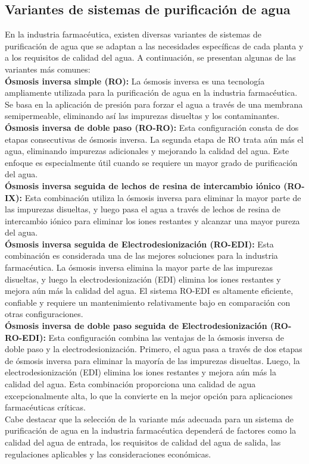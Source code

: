 \subsection{Variantes de sistemas de purificación de agua}

En la industria farmacéutica, existen diversas variantes de sistemas de purificación de agua que se adaptan a las necesidades específicas de cada planta y a los requisitos de calidad del agua. A continuación, se presentan algunas de las variantes más comunes:\\

\textbf{Ósmosis inversa simple (RO):} La ósmosis inversa es una tecnología ampliamente utilizada para la purificación de agua en la industria farmacéutica. Se basa en la aplicación de presión para forzar el agua a través de una membrana semipermeable, eliminando así las impurezas disueltas y los contaminantes.\\

\textbf{Ósmosis inversa de doble paso (RO-RO):} Esta configuración consta de dos etapas consecutivas de ósmosis inversa. La segunda etapa de RO trata aún más el agua, eliminando impurezas adicionales y mejorando la calidad del agua. Este enfoque es especialmente útil cuando se requiere un mayor grado de purificación del agua.\\

\textbf{Ósmosis inversa seguida de lechos de resina de intercambio iónico (RO-IX):} Esta combinación utiliza la ósmosis inversa para eliminar la mayor parte de las impurezas disueltas, y luego pasa el agua a través de lechos de resina de intercambio iónico para eliminar los iones restantes y alcanzar una mayor pureza del agua.\\

\textbf{Ósmosis inversa seguida de Electrodesionización (RO-EDI):} Esta combinación es considerada una de las mejores soluciones para la industria farmacéutica. La ósmosis inversa elimina la mayor parte de las impurezas disueltas, y luego la electrodesionización (EDI) elimina los iones restantes y mejora aún más la calidad del agua. El sistema RO-EDI es altamente eficiente, confiable y requiere un mantenimiento relativamente bajo en comparación con otras configuraciones.\\

\textbf{Ósmosis inversa de doble paso seguida de Electrodesionización (RO-RO-EDI):} Esta configuración combina las ventajas de la ósmosis inversa de doble paso y la electrodesionización. Primero, el agua pasa a través de dos etapas de ósmosis inversa para eliminar la mayoría de las impurezas disueltas. Luego, la electrodesionización (EDI) elimina los iones restantes y mejora aún más la calidad del agua. Esta combinación proporciona una calidad de agua excepcionalmente alta, lo que la convierte en la mejor opción para aplicaciones farmacéuticas críticas.\\


Cabe destacar que la selección de la variante más adecuada para un sistema de purificación de agua en la industria farmacéutica dependerá de factores como la calidad del agua de entrada, los requisitos de calidad del agua de salida, las regulaciones aplicables y las consideraciones económicas.
